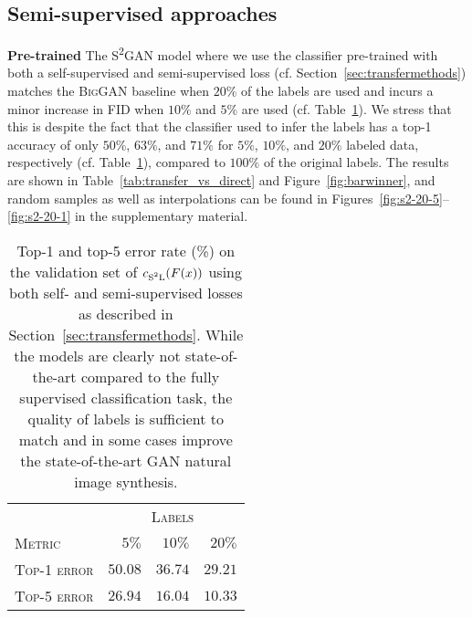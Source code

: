 \documentclass{article}
\newcommand{\cSSL}{c_\text{S\textsuperscript{2}L}}
\newcommand{\tranSS}{\textsc{S\textsuperscript{2}GAN}}
\newcommand{\biggan}{\textsc{BigGAN}}
\begin{document}
\subsection{Semi-supervised approaches}
\textbf{Pre-trained}\quad
The \tranSS{} model where we use the classifier pre-trained with both a self-supervised and semi-supervised loss (cf. Section~\ref{sec:transfermethods}) matches the \biggan{} baseline when $20\%$ of the labels are used and incurs a minor increase in FID when $10\%$ and $5\%$ are used (cf. Table~\ref{tab:semi_self_supervision}). We stress that this is despite the fact that the classifier used to infer the labels has a top-1 accuracy of only $50\%$, $63\%$, and $71\%$ for $5\%$, $10\%$, and $20\%$ labeled data, respectively (cf. Table~\ref{tab:semi_self_supervision}), compared to $100\%$ of the original labels. The results are shown in Table~\ref{tab:transfer_vs_direct} and Figure~\ref{fig:barwinner}, and random samples as well as interpolations can be found in Figures~\ref{fig:s2-20-5}--\ref{fig:s2-20-1} in the supplementary material.
\begin{table}[b]
\centering
\caption{Top-1 and top-5 error rate (\%) on the \imagenet{} validation set of $\cSSL(F(x))$ using both self- and semi-supervised losses as described in Section~\ref{sec:transfermethods}. While the models are clearly not state-of-the-art compared to the fully supervised \imagenet{} classification task, the quality of labels is sufficient to match and in some cases improve the state-of-the-art GAN natural image synthesis.\vspace{0.2cm}}
\begin{tabular}{lrrr}
\toprule
&\multicolumn{3}{c}{\textsc{Labels}}\\
\textsc{Metric}  &  $5\%$  &    $10\%$ &    $20\%$ \\
\midrule
\textsc{Top-1 error} &  $50.08$ & $36.74$ & $29.21$ \\
\textsc{Top-5 error} &  $26.94$ & $16.04$ & $10.33$ \\
\bottomrule
\end{tabular} \label{tab:semi_self_supervision}
\end{table}
\end{document}
